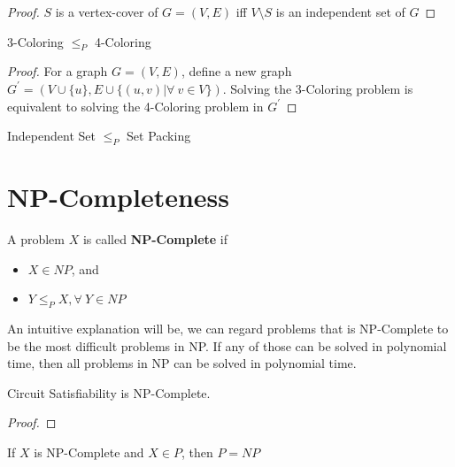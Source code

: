 				\begin{proof}
					$S$ is a vertex-cover of $G = (V, E)$ iff $V \setminus S$ is an independent set of $G$
				\end{proof}

				\begin{lemma}
					3-Coloring $\le_P$ 4-Coloring
				\end{lemma}

				\begin{proof}
					For a graph $G = (V, E)$, define a new graph $G^\prime = (V \cup \{u\}, E \cup \{(u, v) | \forall ~ v \in V\})$. Solving the 3-Coloring problem is equivalent to solving the 4-Coloring problem in $G^\prime$
				\end{proof}

				\begin{lemma}
					Independent Set $\le_P$ Set Packing
				\end{lemma}

			\section{NP-Completeness}
				\begin{definition}[NP-Completeness]
					A problem $X$ is called \textbf{NP-Complete} if
					\begin{itemize}
						\item $X \in NP$, and
						\item $Y \le_P X, \forall ~ Y \in NP$
					\end{itemize}
				\end{definition}

				An intuitive explanation will be, we can regard problems that is NP-Complete to be the most difficult problems in NP. If any of those can be solved in polynomial time, then all problems in NP can be solved in polynomial time.

				\begin{theorem}
					Circuit Satisfiability is NP-Complete.
				\end{theorem}

				\begin{proof}
					
				\end{proof}

				\begin{theorem}
					If $X$ is NP-Complete and $X \in P$, then $P = NP$
				\end{theorem}

